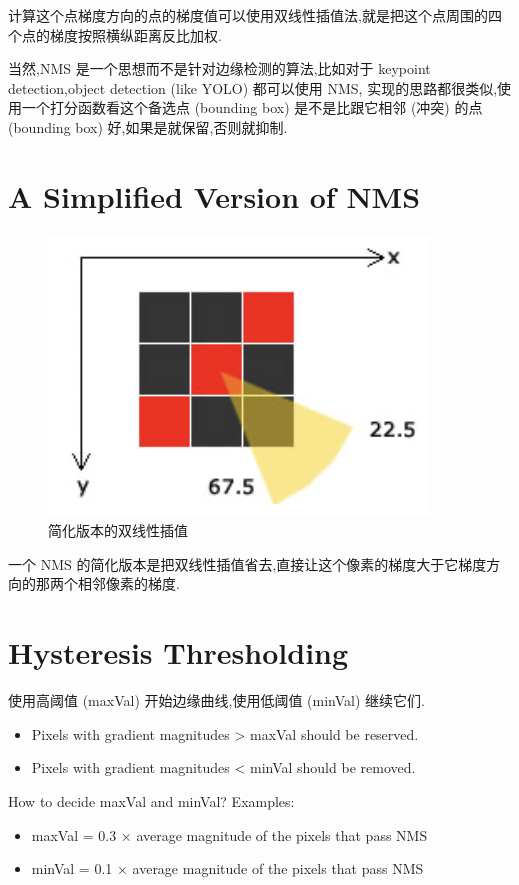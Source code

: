 计算这个点梯度方向的点的梯度值可以使用双线性插值法,就是把这个点周围的四个点的梯度按照横纵距离反比加权.

当然,NMS 是一个思想而不是针对边缘检测的算法,比如对于 keypoint detection,object detection (like YOLO) 都可以使用 NMS,
实现的思路都很类似,使用一个打分函数看这个备选点 (bounding box) 是不是比跟它相邻 (冲突) 的点 (bounding box) 好,如果是就保留,否则就抑制.

\section{A Simplified Version of NMS}

\begin{figure}[htbp]
    \centering
	\includegraphics[scale=0.55]{figures/simple_NMS.png}
	\caption{简化版本的双线性插值}
\end{figure}

一个 NMS 的简化版本是把双线性插值省去,直接让这个像素的梯度大于它梯度方向的那两个相邻像素的梯度.

\section{Hysteresis Thresholding}

使用高阈值 (maxVal) 开始边缘曲线,使用低阈值 (minVal) 继续它们.

\begin{itemize}
    \item Pixels with gradient magnitudes > maxVal should be reserved.
    \item Pixels with gradient magnitudes < minVal should be removed.
\end{itemize}

How to decide maxVal and minVal? Examples:

\begin{itemize}
    \item maxVal = 0.3 $\times$ average magnitude of the pixels that pass NMS
    \item minVal = 0.1 $\times$ average magnitude of the pixels that pass NMS
\end{itemize}

